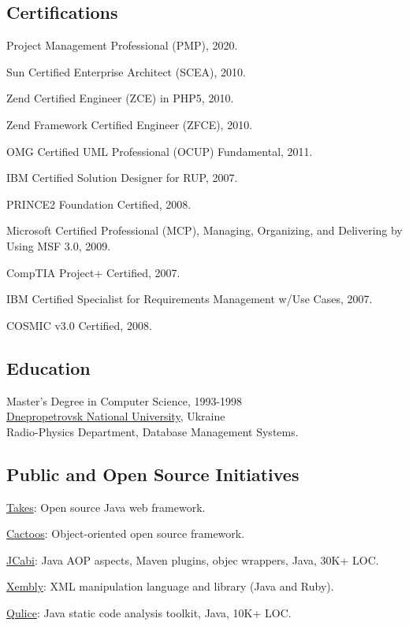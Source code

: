\documentclass[12pt]{article}
\begin{document}
\subsection*{Certifications}

Project Management Professional (PMP), 2020.

Sun Certified Enterprise Architect (SCEA), 2010.

Zend Certified Engineer (ZCE) in PHP5, 2010.

Zend Framework Certified Engineer (ZFCE), 2010.

OMG Certified UML Professional (OCUP) Fundamental, 2011.

IBM Certified Solution Designer for RUP, 2007.

PRINCE2 Foundation Certified, 2008.

Microsoft Certified Professional (MCP), Managing, Organizing, and Delivering by Using MSF 3.0, 2009.

CompTIA Project+ Certified, 2007.

IBM Certified Specialist for Requirements Management w/Use Cases, 2007.

COSMIC v3.0 Certified, 2008.

\subsection*{Education}

Master's Degree in Computer Science, 1993-1998\\
\href{http://dnu.dp.ua/}{Dnepropetrovsk National University}, Ukraine\\
Radio-Physics Department, Database Management Systems.

\subsection*{Public and Open Source Initiatives}

\href{http://www.takes.org}{Takes}: Open source Java web framework.

\href{http://www.cactoos.org}{Cactoos}: Object-oriented open source framework.

\href{http://www.jcabi.com}{JCabi}: Java AOP aspects, Maven plugins, objec wrappers, Java, 30K+ LOC.

\href{http://www.xembly.org}{Xembly}: XML manipulation language and library (Java and Ruby).

\href{http://www.qulice.com}{Qulice}: Java static code analysis toolkit, Java, 10K+ LOC.
\end{document}
